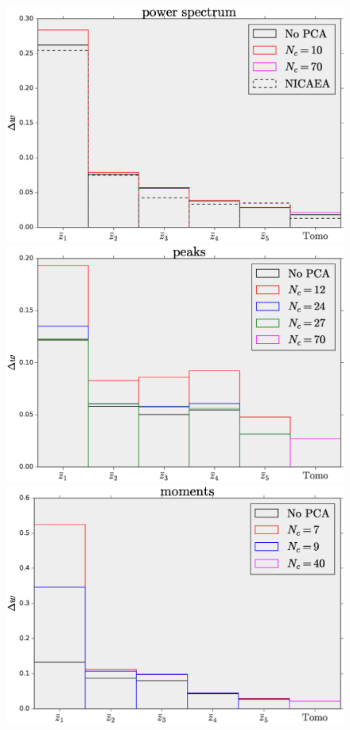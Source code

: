 \documentclass[reprint,aps,prd,superscriptaddress,showkeys,showpacs]{revtex4-1}
\begin{document}
\begin{figure}
\includegraphics[scale=0.3]{Figures/w_power_spectrum_no_pca.eps}
\includegraphics[scale=0.3]{Figures/w_peaks_no_pca.eps}
\includegraphics[scale=0.3]{Figures/w_moments_no_pca.eps}

\end{figure}
\end{document}
